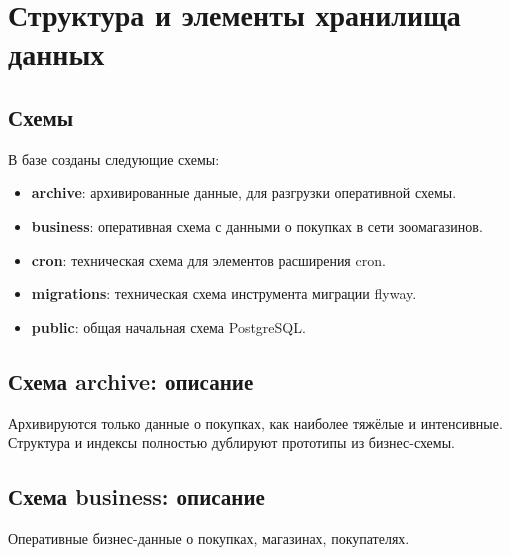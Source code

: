 \documentclass[a4paper,12pt]{article}
\begin{document}
    \section{Структура и элементы хранилища данных}

    \subsection{Схемы}
    В базе созданы следующие схемы:
    \begin{itemize}
        \item \textbf{archive}: архивированные данные, для разгрузки оперативной схемы.
        \item \textbf{business}: оперативная схема с данными о покупках в сети зоомагазинов.
        \item \textbf{cron}: техническая схема для элементов расширения cron.
        \item \textbf{migrations}: техническая схема инструмента миграции flyway.
        \item \textbf{public}: общая начальная схема PostgreSQL.
    \end{itemize}

    \subsection{Схема archive: описание}
    Архивируются только данные о покупках, как наиболее тяжёлые и интенсивные.
    Структура и индексы полностью дублируют прототипы из бизнес-схемы.

    \subsection{Схема business: описание}

    Оперативные бизнес-данные о покупках, магазинах, покупателях.
\end{document}
